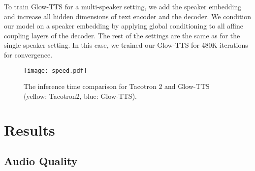 \documentclass{article}
\begin{document}
To train Glow-TTS for a multi-speaker setting, we add the speaker embedding and increase all hidden dimensions of text encoder and the decoder. We condition our model on a speaker embedding by applying global conditioning \cite{van2016wavenet} to all affine coupling layers of the decoder. The rest of the settings are the same as for the single speaker setting. In this case, we trained our Glow-TTS for 480K iterations for convergence.
\begin{table}[t]
\caption{The Mean Opinion Score (MOS) of single speaker TTS models with 95 confidence intervals.}
\label{singlemos}
\vskip 0.15in
\begin{center}
\begin{small}
\begin{sc}
\end{sc}
\end{small}
\end{center}
\vskip -0.1in
\end{table}
\begin{figure}[t]
\begin{center}
\centerline{\texttt{[image: speed.pdf]}}
\caption{The inference time comparison for Tacotron 2 and Glow-TTS (yellow: Tacotron2, blue: Glow-TTS).}
\label{speed}
\end{center}
\end{figure}
\section{Results}
\subsection{Audio Quality}
\label{audioquality}
\end{document}
